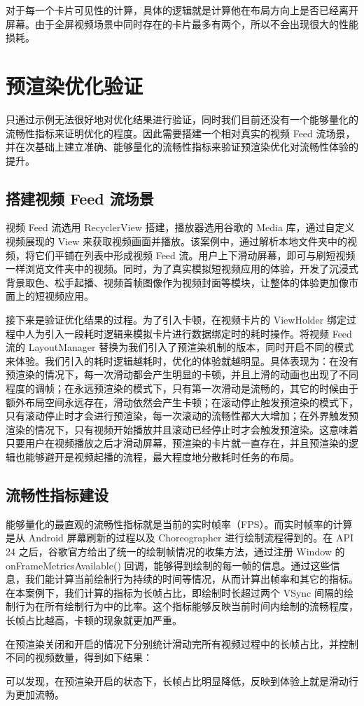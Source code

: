 对于每一个卡片可见性的计算，具体的逻辑就是计算他在布局方向上是否已经离开屏幕。由于全屏视频场景中同时存在的卡片最多有两个，所以不会出现很大的性能损耗。

\section{预渲染优化验证}

只通过示例无法很好地对优化结果进行验证，同时我们目前还没有一个能够量化的流畅性指标来证明优化的程度。因此需要搭建一个相对真实的视频 Feed 流场景，并在次基础上建立准确、能够量化的流畅性指标来验证预渲染优化对流畅性体验的提升。

\subsection{搭建视频 Feed 流场景}

视频 Feed 流选用 RecyclerView 搭建，播放器选用谷歌的 Media 库，通过自定义视频展现的 View 来获取视频画面并播放。该案例中，通过解析本地文件夹中的视频，将它们平铺在列表中形成视频 Feed 流。用户上下滑动屏幕，即可与刷短视频一样浏览文件夹中的视频。同时，为了真实模拟短视频应用的体验，开发了沉浸式背景取色、松手起播、视频首帧图像作为视频封面等模块，让整体的体验更加像市面上的短视频应用。

接下来是验证优化结果的过程。为了引入卡顿，在视频卡片的 ViewHolder 绑定过程中人为引入一段耗时逻辑来模拟卡片进行数据绑定时的耗时操作。将视频 Feed 流的 LayoutManager 替换为我们引入了预渲染机制的版本，同时开启不同的模式来体验。我们引入的耗时逻辑越耗时，优化的体验就越明显。具体表现为：在没有预渲染的情况下，每一次滑动都会产生明显的卡顿，并且上滑的动画也出现了不同程度的调帧；在永远预渲染的模式下，只有第一次滑动是流畅的，其它的时候由于额外布局空间永远存在，滑动依然会产生卡顿；在滚动停止触发预渲染的模式下，只有滚动停止时才会进行预渲染，每一次滚动的流畅性都大大增加；在外界触发预渲染的情况下，只有视频开始播放并且滚动已经停止时才会触发预渲染。这意味着只要用户在视频播放之后才滑动屏幕，预渲染的卡片就一直存在，并且预渲染的逻辑也能够避开是视频起播的流程，最大程度地分散耗时任务的布局。

\subsection{流畅性指标建设}

能够量化的最直观的流畅性指标就是当前的实时帧率（FPS）。而实时帧率的计算是从 Android 屏幕刷新的过程以及 Choreographer 进行绘制流程得到的。在 API 24 之后，谷歌官方给出了统一的绘制帧情况的收集方法，通过注册 Window 的 onFrameMetricsAvailable() 回调，能够得到绘制的每一帧的信息。通过这些信息，我们能计算当前绘制行为持续的时间等情况，从而计算出帧率和其它的指标。在本案例下，我们计算的指标为长帧占比，即绘制时长超过两个 VSync 间隔的绘制行为在所有绘制行为中的比率。这个指标能够反映当前时间内绘制的流畅程度，长帧占比越高，卡顿的现象就更加严重。

在预渲染关闭和开启的情况下分别统计滑动完所有视频过程中的长帧占比，并控制不同的视频数量，得到如下结果：



可以发现，在预渲染开启的状态下，长帧占比明显降低，反映到体验上就是滑动行为更加流畅。